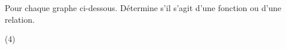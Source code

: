 %
%
    Pour chaque graphe ci-dessous. Détermine s'il s'agit d'une fonction ou d'une relation.
    \begin{tasks}(4)
        \task 
        \task 
        \task 
        \task 
    \end{tasks}
